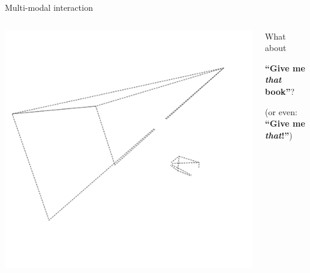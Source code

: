 \documentclass[xcolor=table]{beamer}
\begin{document}

{
\begin{frame}{Multi-modal interaction}

    \begin{columns}
        \begin{column}{0.4\linewidth}
        \centering
        \includegraphics[width=\linewidth]{human-perspective-small}
             
        \end{column}
        \begin{column}{0.6\linewidth}
        
    \centering
    What about

    {\bf ``Give me \emph{that} book''}?

     \footnotesize
    (or even: {\bf ``Give me \emph{that}!''})

       \end{column}
    \end{columns}



\end{frame}
}

\end{document}
